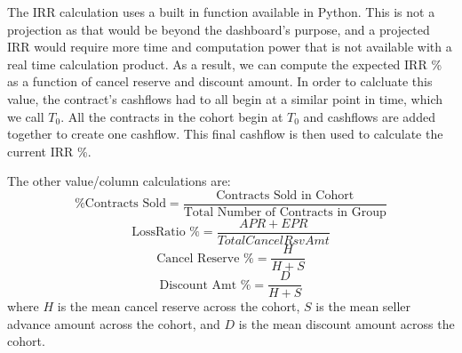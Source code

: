 \documentclass[titlepage]{article}
\begin{document}
The IRR calculation uses a built in function available in Python. This is not a projection as that would be beyond the dashboard's purpose, and a projected IRR would require more time and computation power that is not available with a real time calculation product. As a result, we can compute the expected IRR \% as a function of cancel reserve and discount amount. In order to calcluate this value, the contract's cashflows had to all begin at a similar point in time, which we call $T_0$. All the contracts in the cohort begin at $T_0$ and cashflows are added together to create one cashflow. This final cashflow is then used to calculate the current IRR \%. 

The other value/column calculations are: 
\begin{equation}
\text{\% Contracts Sold} = \frac{\text{Contracts Sold in Cohort}}{\text{Total Number of Contracts in Group}}
\end{equation}
\begin{equation}
\text{LossRatio \%} = \frac{APR + EPR}{TotalCancelRsvAmt}
\end{equation}
\begin{equation}
\text{Cancel Reserve \%} = \frac{H}{H+S}
\end{equation}
\begin{equation}
\text{Discount Amt \%} = \frac{D}{H+S}
\end{equation}
where $H$ is the mean cancel reserve across the cohort, $S$ is the mean seller advance amount across the cohort, and $D$ is the mean discount amount across the cohort.
\newpage
\end{document}
